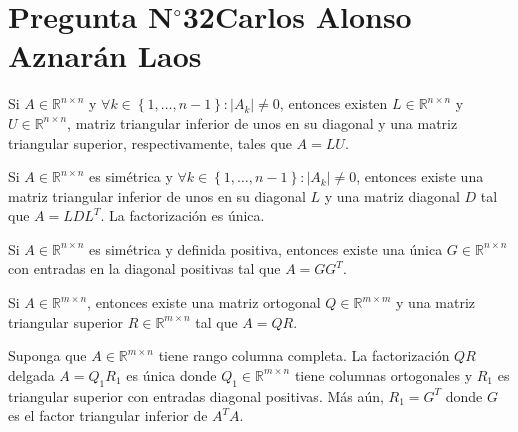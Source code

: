 \section{Pregunta N$^{\circ}$32\qquad Carlos Alonso Aznarán Laos}

\begin{frame}

	\begin{theorem}[Factorización $LU$]
		Si $A\in\mathbb{R}^{n\times n}$ y
		\begin{math}
			\forall k\in\left\{1,\dotsc,n-1\right\}:
			\left|A_{k}\right|\neq 0
		\end{math},
		entonces existen $L\in\mathbb{R}^{n\times n}$ y
		$U\in\mathbb{R}^{n\times n}$, matriz triangular inferior de unos
		en su diagonal y una matriz triangular superior, respectivamente,
		tales que $A=LU$.
	\end{theorem}

	\begin{theorem}
		Si $A\in\mathbb{R}^{n\times n}$ es simétrica y
		\begin{math}
			\forall k\in\left\{1,\dotsc,n-1\right\}:
			\left|A_{k}\right|\neq 0
		\end{math},
		entonces existe una matriz triangular inferior de unos en su
		diagonal $L$ y una matriz diagonal $D$ tal que $A=LDL^{T}$.
		La factorización es única.
	\end{theorem}

	\begin{theorem}
		Si $A\in\mathbb{R}^{n\times n}$ es simétrica y definida
		positiva, entonces existe una única
		$G\in\mathbb{R}^{n\times n}$ con entradas en la diagonal
		positivas tal que $A=GG^{T}$.
	\end{theorem}

	\begin{theorem}[Factorización $QR$]
		Si $A\in\mathbb{R}^{m\times n}$, entonces existe una matriz
		ortogonal $Q\in\mathbb{R}^{m\times m}$ y una matriz triangular
		superior $R\in\mathbb{R}^{m\times n}$ tal que $A=QR$.
	\end{theorem}

	\begin{theorem}
		Suponga que $A\in\mathbb{R}^{m\times n}$ tiene rango columna
		completa.
		La factorización $QR$ delgada $A=Q_{1}R_{1}$ es única donde
		$Q_{1}\in\mathbb{R}^{m\times n}$ tiene columnas ortogonales y
		$R_{1}$ es triangular superior con entradas diagonal positivas.
		Más aún, $R_{1}=G^{T}$ donde $G$ es el factor triangular
		inferior de $A^{T}A$.
	\end{theorem}
\end{frame}

